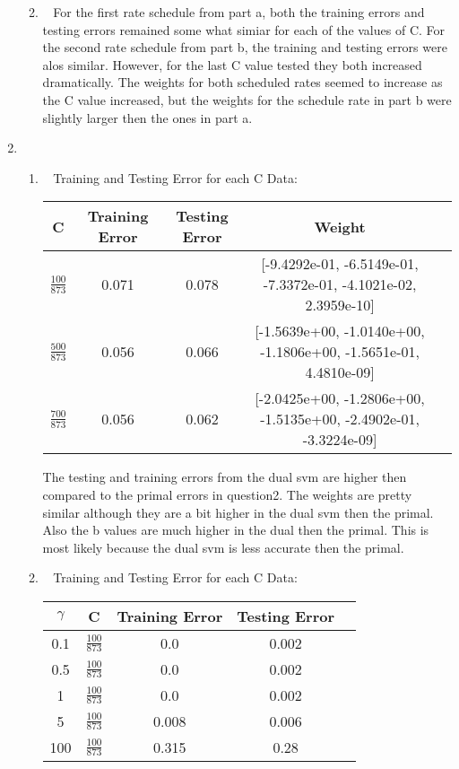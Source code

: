 \documentclass[12pt, fullpage,letterpaper]{article}
\begin{document}
\begin{enumerate}
\begin{enumerate}
\begin{table}[h]
\end{table}
		\newline 
		\item~
		\newline For the first rate schedule from part a, both the training errors and testing errors remained some what simiar for each of the values of C. For the second rate schedule from part b, the training and testing errors were alos similar. However, for the last C value tested they both increased dramatically. 
			   The weights for both scheduled rates seemed to increase as the C value increased, but the weights for the schedule rate in part b were slightly larger then the ones in part a. 
	\end{enumerate}


\item~ 

\begin{enumerate}
	\item ~
	\newline Training and Testing Error for each C Data:
	\newline
		\begin{table}[h]
	\centering
	\begin{tabular}{c|c|c|c|c}
		C & Training Error & Testing Error & Weight\\ 
		\hline\hline
		$\frac{100}{873}$ & 0.071 & 0.078 & [-9.4292e-01, -6.5149e-01, -7.3372e-01, -4.1021e-02, 2.3959e-10] \\ \hline
		$\frac{500}{873}$ & 0.056 & 0.066 & [-1.5639e+00, -1.0140e+00, -1.1806e+00, -1.5651e-01, 4.4810e-09] \\ \hline
		$\frac{700}{873}$ & 0.056 & 0.062 & [-2.0425e+00, -1.2806e+00, -1.5135e+00, -2.4902e-01, -3.3224e-09] \\ \hline
	\end{tabular}
\end{table}
	\newline The testing and training errors from the dual svm are higher then compared to the primal errors in question2. The weights are pretty similar although they are a bit higher in the dual svm then the primal. Also the b values are much higher in the dual then the primal. This is most likely because the dual svm is less accurate then the primal. 
	\item~
	\newline Training and Testing Error for each C Data:
	\newline
		\begin{table}[h]
	\centering
	\begin{tabular}{c|c|c|c|c}
		$\gamma$ & C & Training Error & Testing Error \\ 
		\hline\hline
		0.1 & $\frac{100}{873}$ & 0.0 & 0.002 \\ \hline
		0.5 & $\frac{100}{873}$ & 0.0 & 0.002  \\ \hline
		1 & $\frac{100}{873}$ & 0.0 & 0.002  \\ \hline
		5 & $\frac{100}{873}$ & 0.008 & 0.006  \\ \hline
		100 & $\frac{100}{873}$ & 0.315 & 0.28  \\ \hline


\end{tabular}
\end{table}
\end{enumerate}
\end{enumerate}
\end{document}
